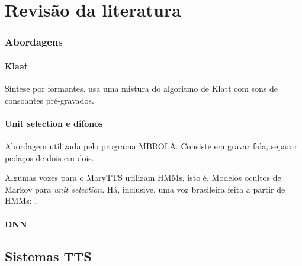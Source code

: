 

\chapter{Revisão da literatura}



\subsection{Abordagens}
\subsubsection{Klaat}
Síntese por formantes. \cite{espeakng} usa uma mistura do algoritmo de Klatt com
sons de consoantes pré-gravados.
\subsubsection{Unit selection e dífonos}
Abordagem utilizada pelo programa MBROLA. Consiste em gravar fala, separar
pedaços de dois em dois.

Algumas vozes para o MaryTTS \cite{marytts} utilizam HMMs, isto é, Modelos
ocultos de Markov para \emph{unit selection}. Há, inclusive, uma voz brasileira
feita a partir de HMMs: \cite{couto}.
\subsubsection{DNN}


\section{Sistemas TTS}
